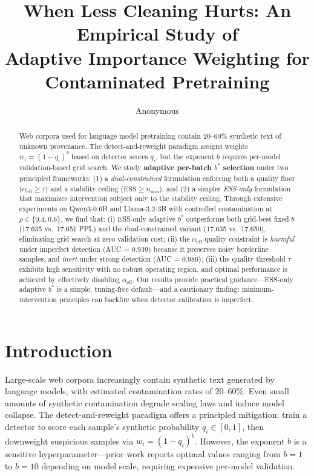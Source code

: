 \documentclass[11pt]{article}
\title{When Less Cleaning Hurts: An Empirical Study of\\Adaptive Importance Weighting for Contaminated Pretraining}
\author{Anonymous}
\date{}
\begin{document}
\maketitle

\begin{abstract}
Web corpora used for language model pretraining contain 20--60\% synthetic text of unknown provenance. The detect-and-reweight paradigm assigns weights $w_i = (1 - q_i)^b$ based on detector scores $q_i$, but the exponent $b$ requires per-model validation-based grid search.
We study \textbf{adaptive per-batch $b^*$ selection} under two principled frameworks: (1) a \emph{dual-constrained} formulation enforcing both a quality floor ($\alpha_{\mathrm{eff}} \geq \tau$) and a stability ceiling ($\mathrm{ESS} \geq n_{\min}$), and (2) a simpler \emph{ESS-only} formulation that maximizes intervention subject only to the stability ceiling.
Through extensive experiments on Qwen3-0.6B and Llama-3.2-3B with controlled contamination at $\rho \in \{0.4, 0.6\}$, we find that:
(i) ESS-only adaptive $b^*$ outperforms both grid-best fixed $b$ (17.635 vs.\ 17.651 PPL) and the dual-constrained variant (17.635 vs.\ 17.650), eliminating grid search at zero validation cost;
(ii) the $\alpha_{\mathrm{eff}}$ quality constraint is \emph{harmful} under imperfect detection (AUC = 0.939) because it preserves noisy borderline samples, and \emph{inert} under strong detection (AUC = 0.986);
(iii) the quality threshold $\tau$ exhibits high sensitivity with no robust operating region, and optimal performance is achieved by effectively disabling $\alpha_{\mathrm{eff}}$.
Our results provide practical guidance---ESS-only adaptive $b^*$ is a simple, tuning-free default---and a cautionary finding: minimum-intervention principles can backfire when detector calibration is imperfect.
\end{abstract}

\section{Introduction}
\label{sec:intro}

Large-scale web corpora increasingly contain synthetic text generated by language models, with estimated contamination rates of 20--60\%. Even small amounts of synthetic contamination degrade scaling laws and induce model collapse. The detect-and-reweight paradigm offers a principled mitigation: train a detector to score each sample's synthetic probability $q_i \in [0,1]$, then downweight suspicious samples via $w_i = (1-q_i)^b$. However, the exponent $b$ is a sensitive hyperparameter---prior work reports optimal values ranging from $b=1$ to $b=10$ depending on model scale, requiring expensive per-model validation.
\end{document}
